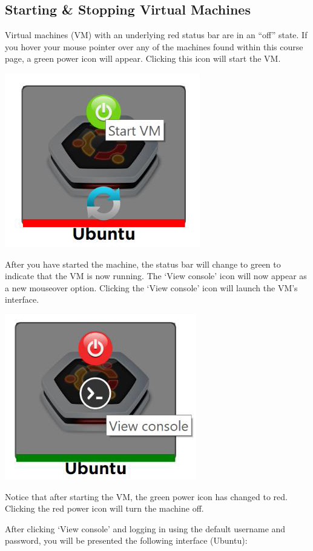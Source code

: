 \documentclass[12pt]{article}
\begin{document}
\subsection*{Starting \& Stopping Virtual Machines}
Virtual machines (VM) with an underlying red status bar are in an ``off” state. If you hover your mouse pointer over any of the machines found within this course page, a green power icon will appear. Clicking this icon will start the VM.

{%
\centering
\includegraphics[scale=0.50]{start_vm.png}

}
After you have started the machine, the status bar will change to green to indicate that the VM is now running. The ‘View console’ icon will now appear as a new mouseover option. Clicking the ‘View console’ icon will launch the VM’s interface. 


{%
\centering
\includegraphics[scale=0.50]{view_console.png}

}
Notice that after starting the VM, the green power icon has changed to red. Clicking the red power icon will turn the machine off.

After clicking ‘View console’ and logging in using the default username and password, you will be presented the following interface (Ubuntu):
\end{document}
